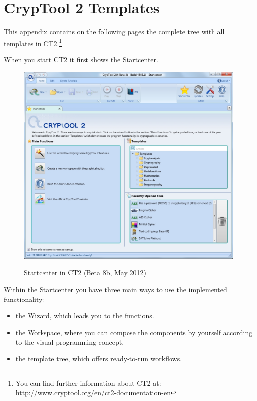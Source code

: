 \newpage
\hypertarget{appendix-template-overview-CT2}{}
\section{CrypTool 2 Templates}
\label{s:appendix-template-overview-CT2}

\noindent This appendix contains on the following pages the complete tree with
all templates in CT2.\footnote{%
  You can find further information about CT2 at:
  \url{http://www.cryptool.org/en/ct2-documentation-en}
}

\noindent When you start CT2 it first shows the Startcenter.

\begin{figure}[hb]
\begin{center}
\includegraphics[scale=0.45, angle=0] {figures/CT2-Startcenter-en}
\hypertarget{Welcome-CT2}{}
\caption{Startcenter in CT2 (Beta 8b, May 2012)} 
\label{Welcome-Screenshot-CT2}
\end{center}
\end{figure}

\noindent Within the Startcenter you have three main ways to use the implemented functionality:
\begin{itemize}
   \item the Wizard, which leads you to the functions.
   \item the Workspace, where you can compose the components by yourself according to the visual programming concept.
   \item the template tree, which offers ready-to-run workflows.
 \end{itemize}


